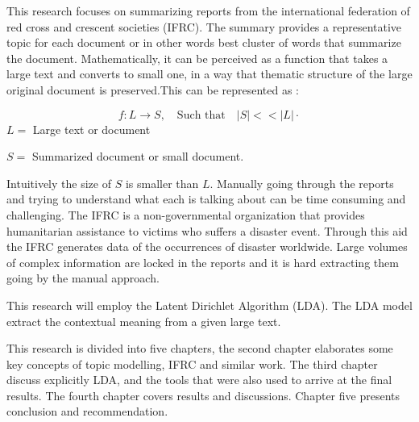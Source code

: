 This research focuses on summarizing reports from the international federation of red cross and crescent societies (IFRC). The summary provides  a  representative topic for each document or in other words best cluster of words that summarize the document. Mathematically, it can be perceived as a function that takes a large text and converts to small one, in a way that thematic structure of the large original document is preserved.This can be represented as :

$$f:L \longrightarrow S, \quad \text{Such that} \quad |S|<< |L| \cdot$$
$L=$ Large text or document

 $S=$ Summarized document or small document.
  
Intuitively the size of $S$ is smaller than $L$.
Manually going through the reports and trying to understand what each is talking about can be time consuming and challenging. The IFRC is a non-governmental organization
that provides humanitarian assistance to victims who suffers a disaster event. Through this aid the 	IFRC generates data of the occurrences of disaster worldwide. Large volumes of complex information    are locked in the reports and it is hard extracting them going by the manual approach. 

This research will employ the Latent Dirichlet Algorithm (LDA).
 The LDA model extract the contextual meaning from a given large text. 

This research is divided into five chapters, the second chapter elaborates some key concepts of topic modelling, IFRC and similar work. The third chapter discuss explicitly LDA,  and the tools that were also used to arrive at the final results. The fourth chapter covers results and discussions. Chapter five presents conclusion and recommendation.

  
